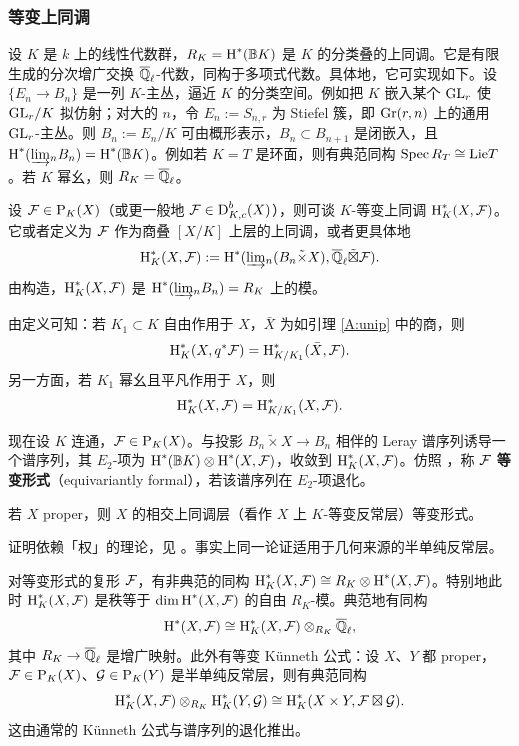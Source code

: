 \subsubsection{等变上同调}\label{A:char class}
设 $K$ 是 $k$ 上的线性代数群，$R_{K}=\operatorname{H}^*({\mathbb B} K)$ 是 $K$ 的分类叠的上同调。它是有限生成的分次增广交换 ${\overline{{\mathbb Q}}_\ell}$-代数，同构于多项式代数。具体地，它可实现如下。设 $\{E_n\to B_n\}$ 是一列 $K$-主丛，逼近 $K$ 的分类空间。例如把 $K$ 嵌入某个 ${\operatorname{GL}}_r$ 使 ${\operatorname{GL}}_r/K$ 拟仿射；对大的 $n$，令 $E_n:=S_{n,r}$ 为 Stiefel 簇，即 ${\operatorname{Gr}}(r,n)$ 上的通用 ${\operatorname{GL}}_r$-主丛。则 $B_n:=E_n/K$ 可由概形表示，$B_n\subset B_{n+1}$ 是闭嵌入，且 $\operatorname{H}^*(\underrightarrow\lim_n B_n)= \operatorname{H}^*({\mathbb B} K)$。例如若 $K=T$ 是环面，则有典范同构 $\operatorname{Spec} R_T\cong {\operatorname{Lie}} T$。若 $K$ 幂幺，则 $R_K={\overline{{\mathbb Q}}_\ell}$。

设 ${\mathcal F}\in \operatorname{P}_K(X)$（或更一般地 ${\mathcal F}\in\operatorname{D}^b_{K,c}(X)$），则可谈 $K$-等变上同调 $\operatorname{H}_K^*(X,{\mathcal F})$。它或者定义为 ${\mathcal F}$ 作为商叠 $[X/K]$ 上层的上同调，或者更具体地
\[\operatorname{H}_K^*(X,{\mathcal F}):=\operatorname{H}^*(\underrightarrow\lim_n (B_n\tilde\times X), {\overline{{\mathbb Q}}_\ell}\tilde\boxtimes {\mathcal F}).\]
由构造，$\operatorname{H}^*_K(X,{\mathcal F})$ 是 $\operatorname{H}^*(\underrightarrow\lim_n B_n)=R_{K}$ 上的模。

由定义可知：若 $K_1\subset K$ 自由作用于 $X$，$\bar X$ 为如引理 \ref{A:unip} 中的商，则
\begin{equation}\label{coh free action}
\operatorname{H}^*_K(X,q^*{\mathcal F})=\operatorname{H}^*_{K/K_1}(\bar X,{\mathcal F}).
\end{equation}
另一方面，若 $K_1$ 幂幺且平凡作用于 $X$，则
\begin{equation}\label{coh unip}
\operatorname{H}^*_K(X,{\mathcal F})=\operatorname{H}^*_{K/K_1}(X,{\mathcal F}).
\end{equation}

现在设 $K$ 连通，${\mathcal F}\in\operatorname{P}_K(X)$。与投影 $B_n\tilde\times X\to B_n$ 相伴的 Leray 谱序列诱导一个谱序列，其 $E_2$-项为 $\operatorname{H}^*({\mathbb B} K)\otimes \operatorname{H}^*(X,{\mathcal F})$，收敛到 $\operatorname{H}^*_K(X,{\mathcal F})$。仿照 \cite{GKM}，称 ${\mathcal F}$ \textbf{等变形式}（equivariantly formal），若该谱序列在 $E_2$-项退化。

\begin{thm}
若 $X$ proper，则 $X$ 的相交上同调层（看作 $X$ 上 $K$-等变反常层）等变形式。
\end{thm}

证明依赖「权」的理论，见 \cite[Theorem 14.1]{GKM}。事实上同一论证适用于几何来源的半单纯反常层。

对等变形式的复形 ${\mathcal F}$，有非典范的同构 $\operatorname{H}^*_K(X,{\mathcal F})\cong R_{K}\otimes\operatorname{H}^*(X,{\mathcal F})$。特别地此时 $\operatorname{H}^*_K(X,{\mathcal F})$ 是秩等于 $\dim \operatorname{H}^*(X,{\mathcal F})$ 的自由 $R_{K}$-模。典范地有同构
\begin{equation}\label{de-equiv}
\operatorname{H}^*(X,{\mathcal F})\cong \operatorname{H}^*_K(X,{\mathcal F})\otimes_{R_{K}}{\overline{{\mathbb Q}}_\ell},
\end{equation}
其中 $R_{K}\to{\overline{{\mathbb Q}}_\ell}$ 是增广映射。此外有等变 K\"unneth 公式：设 $X$、$Y$ 都 proper，${\mathcal F}\in\operatorname{P}_K(X)$、${\mathcal G}\in\operatorname{P}_K(Y)$ 是半单纯反常层，则有典范同构
\begin{equation}\label{equiv Kunneth}
\operatorname{H}_K^*(X,{\mathcal F})\otimes_{R_{K}}\operatorname{H}_K^*(Y,{\mathcal G})\cong \operatorname{H}^*_K(X\times Y,{\mathcal F}\boxtimes{\mathcal G}).
\end{equation}
这由通常的 K\"unneth 公式与谱序列的退化推出。

